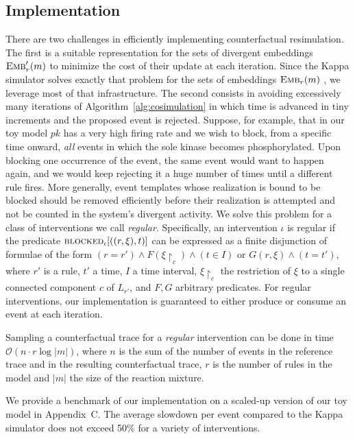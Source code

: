 
\subsection{Implementation}\label{subsec:implementation}

There are two challenges in efficiently implementing counterfactual
resimulation. The first is a suitable representation for the sets of
divergent embeddings ${\textsc{Emb}}'_{r}(m)$ to minimize the cost of their
update at each iteration. Since the Kappa simulator solves exactly
that problem for the sets of embeddings ${\textsc{Emb}}_{r}(m)$
\cite{DanosEtAl-APLAS07}, we leverage most of that infrastructure. The
second consists in avoiding excessively many iterations of
Algorithm~\ref{alg:cosimulation} in which time is advanced in tiny
increments and the proposed event is rejected.
Suppose, for example, that in our toy model
$pk$ has a very high firing rate and we wish to block, from a
specific time onward, \emph{all} events in which the sole kinase
becomes phosphorylated. Upon blocking one occurrence of the event, the
same event would want to happen again, and we would keep rejecting it
a huge number of times until a different rule fires. More generally,
event templates whose realization is bound to be blocked should be
removed efficiently before their realization is attempted and not be
counted in the system's divergent activity. We solve this problem
for a class of interventions we call \emph{regular}.
Specifically, an intervention $\iota$ is regular if
the predicate ${\textsc{blocked}}_{\iota}[((r, \xi), t)]$ can be expressed as a
finite disjunction of formulae of the form
$(r \!=\! r') \wedge F(\xi{\restriction_{c}}) \wedge (t \!\in\! I)$ or
$G(r, \xi) \wedge (t \!=\! t')$, where $r'$ is a rule, $t'$ a time, $I$ a
time interval, $\xi{\restriction_{c}}$ the restriction of $\xi$ to a
single connected component $c$ of $L_{r'}$, and $F, G$ arbitrary
predicates. For regular interventions, our implementation is
guaranteed to either produce or consume an event at each iteration.

\begin{proposition}
  Sampling a counterfactual trace for a \emph{regular} intervention
  can be done in time $\mathcal{O}(n \cdot r \log|m|)$, where $n$ is
  the sum of the number of events in the reference trace and in the
  resulting counterfactual trace, $r$ is the number of rules in the
  model and $|m|$ the size of the reaction mixture.
\end{proposition}

We provide a benchmark of our implementation on a scaled-up version of
our toy model in Appendix~C. The average slowdown per
event compared to the Kappa simulator does not exceed 50\% for a
variety of interventions.

\medskip
